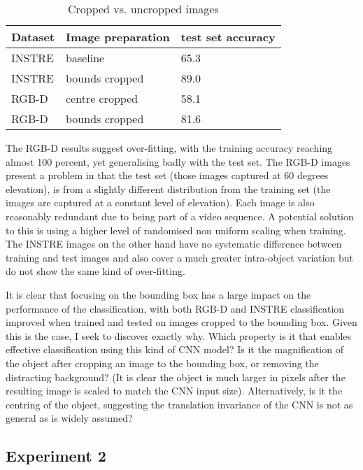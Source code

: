 \begin{table}[h]
  \centering
    \caption{Cropped vs. uncropped images }
    
  \begin{tabular}{ l l l }
    
    Dataset & Image preparation & test set accuracy \\
    \toprule
    
    INSTRE & baseline &  65.3 \\
    INSTRE & bounds cropped & 89.0 \\
    
    RGB-D & centre cropped & 58.1 \\
    RGB-D & bounds cropped & 81.6 \\
    
    \bottomrule
  \end{tabular}
\label{fig:focus_crop}
\end{table}

The RGB-D results suggest over-fitting, with the training accuracy reaching almost 100 percent, yet generalising badly with the test set. The RGB-D images present a problem in that the test set (those images captured at 60 degrees elevation), is from a slightly different distribution from the training set (the images are captured at a constant level of elevation). Each image is also reasonably redundant due to being part of a video sequence. A potential solution to this is using a higher level of randomised non uniform scaling when training. The INSTRE images on the other hand have no systematic difference between training and test images and also cover a much greater intra-object variation but do not show the same kind of over-fitting.

It is clear that focusing on the bounding box has a large impact on the performance of the classification, with both RGB-D and INSTRE classification improved when trained and tested on images cropped to the bounding box. Given this is the case, I seek to discover exactly why. Which property is it that enables effective classification using this kind of CNN model? Is it the magnification of the object after cropping an image to the bounding box, or removing the distracting background? (It is clear the object is much larger in pixels after the resulting image is scaled to match the CNN input size). Alternatively, is it the centring of the object, suggesting the translation invariance of the CNN is not as general as is widely assumed?


\subsection {Experiment 2}

